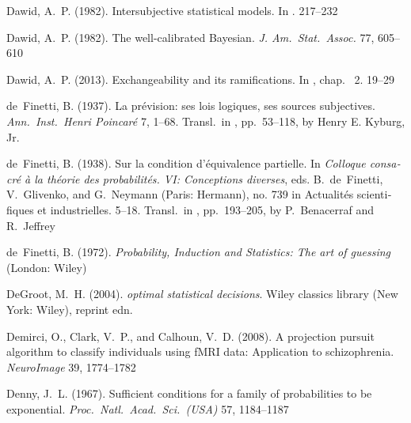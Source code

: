 \documentclass[%
]{frontiersSCNS-nologo} %
\newcommand*{\langfrench}{\foreignlanguage{french}}
\newcommand*{\citein}[2][]{\textnormal{\citet[#1]{#2}}%
}
\newcommand*{\citebi}[2][]{\citet[#1]{#2}%
}
\newcommand*{\chapb}{}
\renewcommand*{\|}{\mathpunct{|}}%
\begin{document}
\begin{thebibliography}{156}
Dawid, A.~P. (1982{}).
\newblock Intersubjective statistical models.
\newblock In \emph{\citein{kochetal1982}}. 217--232

Dawid, A.~P. (1982{}).
\newblock The well-calibrated {Bayesian}.
\newblock \emph{J. Am.\ Stat.\ Assoc.} 77, 605--610

Dawid, A.~P. (2013).
\newblock Exchangeability and its ramifications.
\newblock In \emph{\citein{damienetal2013}}, chap. \chapb~2. 19--29

de~Finetti, B. (1937).
\newblock \langfrench{{La} pr{\'e}vision: ses lois logiques, ses sources
  subjectives}.
\newblock \emph{Ann.\ Inst.\ Henri Poincar{\'e}} 7, 1--68.
\newblock Transl.\ in \citebi{kyburgetal1964_r1980}, pp.~53--118, by Henry E.
  Kyburg, Jr.

de~Finetti, B. (1938).
\newblock \langfrench{{Sur} la condition d'{\'e}quivalence partielle}.
\newblock In \emph{\langfrench{Colloque consacr{\'e} {\`a} la th{\'e}orie des
  probabilit{\'e}s. VI: Conceptions diverses}}, eds. B.~de~Finetti,
  V.~Glivenko, and G.~Neymann (Paris: Hermann), no. 739 in
  \langfrench{Actualit{\'e}s scientifiques et industrielles}. 5--18.
\newblock Transl.\ in \citebi{jeffrey1980}, pp.~193--205, by P.~Benacerraf and
  R.~Jeffrey

de~Finetti, B. (1972).
\newblock \emph{Probability, Induction and Statistics: The art of guessing}
  (London: Wiley)

DeGroot, M.~H. (2004).
\newblock \emph{{optimal statistical decisions}}.
\newblock Wiley classics library (New York: Wiley), reprint edn.

Demirci, O., Clark, V.~P., and Calhoun, V.~D. (2008).
\newblock A projection pursuit algorithm to classify individuals using {fMRI}
  data: Application to schizophrenia.
\newblock \emph{NeuroImage} 39, 1774--1782

Denny, J.~L. (1967).
\newblock Sufficient conditions for a family of probabilities to be
  exponential.
\newblock \emph{Proc.\ Natl.\ Acad.\ Sci.\ (USA)} 57, 1184--1187


\end{thebibliography}
\end{document}
